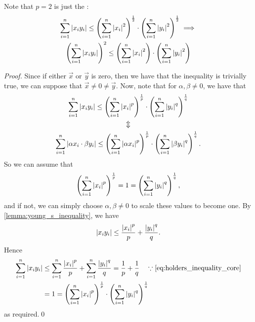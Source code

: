 \documentclass[notoc,notitlepage]{tufte-book}
\begin{document}
\begin{note}
  Note that $p = 2$ is just the :
  \begin{gather*}
    \sum_{i=1}^{n} \left|x_i y_i\right| \leq \left( \sum_{i=1}^{n} \left|x_i\right|^2 \right)^{ \frac{1}{2} } \cdot \left( \sum_{i=1}^{n} \left|y_i\right|^2 \right)^{\frac{1}{2}} \implies \\
    \left( \sum_{i=1}^{n} \left|x_i y_i\right| \right)^2 \leq \left( \sum_{i=1}^{n} \left|x_i\right|^2 \right) \cdot \left( \sum_{i=1}^{n} \left|y_i\right|^2 \right)
  \end{gather*}
\end{note}

\begin{proof}
  Since if either $\vec{x}$ or $\vec{y}$ is zero, then we have that the inequality is trivially true, we can suppose that $\vec{x} \neq 0 \neq \vec{y}$. Now, note that for $\alpha, \beta \neq 0$, we have that
  \begin{gather*}
    \sum_{i=1}^{n}  \left| x_i y_i \right| \leq \left( \sum_{i=1}^{n} \left|x_i\right|^p \right)^{\frac{1}{p}} \cdot \left( \sum_{i=1}^{n} \left|y_i\right|^q \right)^{\frac{1}{q}} \\
    \Updownarrow \\
    \sum_{i=1}^{n}  \left| \alpha x_i \cdot \beta y_i \right| \leq \left( \sum_{i=1}^{n} \left|\alpha x_i\right|^p \right)^{\frac{1}{p}} \cdot \left( \sum_{i=1}^{n} \left|\beta y_i\right|^q \right)^{\frac{1}{q}}.
  \end{gather*}
  So we can assume that
  \begin{equation}\label{eq:holders_inequality_core}
    \left( \sum_{i=1}^{n} \left|x_i\right|^p \right)^\frac{1}{p} = 1 = \left( \sum_{i=1}^{n} \left|y_i\right|^q \right)^\frac{1}{q},
  \end{equation}
  and if not, we can simply choose $\alpha, \beta \neq 0$ to scale these values to become one. By \cref{lemma:young_s_inequality}, we have
  \begin{equation*}
    \left|x_i y_i\right| \leq \frac{\left|x_i\right|^p}{p} + \frac{\left|y_i\right|^q}{q}.
  \end{equation*}
  Hence
  \begin{align*}
    \sum_{i=1}^{n} \abs{x_i y_i} &\leq \sum_{i=1}^{n} \frac{\abs{x_i}^p}{p} + \sum_{i=1}^{n} \frac{\abs{y_i}^q}{q} = \frac{1}{p} + \frac{1}{q} \quad \because \cref{eq:holders_inequality_core} \\
                                 &= 1 = \left( \sum_{i=1}^{n} \abs{x_i}^p \right)^\frac{1}{p} \cdot \left( \sum_{i=1}^{n} \abs{y_i}^q \right)^\frac{1}{q}
  \end{align*}
  as required.\qed
\end{proof}
\end{document}
